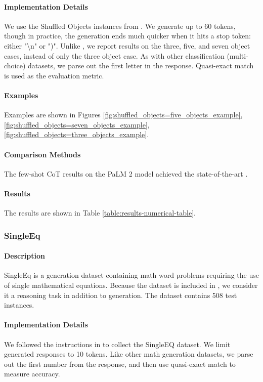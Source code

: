\paragraph{Implementation Details}
We use the Shuffled Objects instances from \citet{suzgun2022challenging}. We generate up to 60 tokens, though in practice, the generation ends much quicker when it hits a stop token: either "\textbackslash n" or ")". Unlike \citet{kojima2023large}, we report results on the three, five, and seven object cases, instead of only the three object case. As with other classification (multi-choice) datasets, we parse out the first letter in the response. Quasi-exact match is used as the evaluation metric.

\paragraph{Examples} Examples are shown in Figures \ref{fig:shuffled_objects=five_objects_example}, \ref{fig:shuffled_objects=seven_objects_example}, \ref{fig:shuffled_objects=three_objects_example}.

\paragraph{Comparison Methods}
The few-shot CoT results on the PaLM 2 model achieved the state-of-the-art \citep{anil2023palm}.

\paragraph{Results} The results are shown in Table \ref{table:results-numerical-table}.

\subsubsection{SingleEq}
\paragraph{Description} SingleEq \citep{koncel-kedziorski-etal-2016-mawps} is a generation dataset containing math word problems requiring the use of single mathematical equations. Because the dataset is included in \citet{kojima2023large}, we consider it a reasoning task in addition to generation. The dataset contains 508 test instances.

\paragraph{Implementation Details}
We followed the instructions in \citet{kojima2023large} to collect the SingleEQ dataset. We limit generated responses to 10 tokens. Like other math generation datasets, we parse out the first number from the response, and then use quasi-exact match to measure accuracy.

